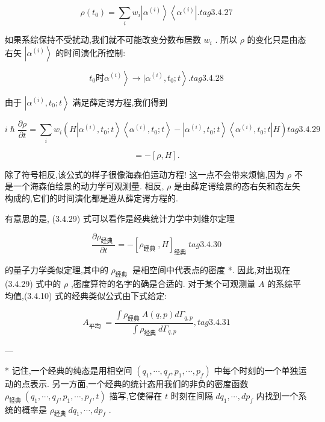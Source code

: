 $$
\rho \left( {t}_{0}\right) = \mathop{\sum }\limits_{i}{w}_{i}\left| {\alpha }^{\left( i\right) }\right\rangle \left\langle {\alpha }^{\left( i\right) }\right| . tag{3. 4.27}
$$

如果系综保持不受扰动,我们就不可能改变分数布居数 ${w}_{i}$ . 所以 $\rho$ 的变化只是由态右矢 $\left| {\alpha }^{\left( i\right) }\right\rangle$ 的时间演化所控制:

$$
{t}_{0}\text{时}\left. {\left. {\alpha }^{\left( i\right) }\right\rangle \rightarrow \mid {\alpha }^{\left( i\right) },{t}_{0};t}\right\rangle \text{.} tag{3. 4.28}
$$

由于 $\left| {{\alpha }^{\left( i\right) },{t}_{0};t}\right\rangle$ 满足薛定谔方程,我们得到

$$
i\hslash \frac{\partial \rho }{\partial t} = \mathop{\sum }\limits_{i}{w}_{i}\left( {H\left| {{\alpha }^{\left( i\right) },{t}_{0};t}\right\rangle \left\langle {{\alpha }^{\left( i\right) },{t}_{0};t}\right\rangle - \left| {{\alpha }^{\left( i\right) },{t}_{0};t}\right\rangle \left\langle {{\alpha }^{\left( i\right) },{t}_{0};t}\right| H}\right) tag{3. 4.29}
$$

$$
= - \left\lbrack {\rho, H}\right\rbrack \text{.}
$$

除了符号相反,该公式的样子很像海森伯运动方程! 这一点不会带来烦恼,因为 $\rho$ 不是一个海森伯绘景的动力学可观测量. 相反, $\rho$ 是由薛定谔绘景的态右矢和态左矢构成的,它们的时间演化都是遵从薛定谔方程的.

有意思的是, (3.4.29) 式可以看作是经典统计力学中刘维尔定理

$$
\frac{\partial {\rho }_{\text{经典 }}}{\partial t} = - {\left\lbrack {\rho }_{\text{经典 }}, H\right\rbrack }_{\text{经典 }} tag{3.4.30}
$$

的量子力学类似定理,其中的 ${\rho }_{\text{经典 }}$ 是相空间中代表点的密度 *. 因此,对出现在 (3.4.29) 式中的 $\rho$ ,密度算符的名字的确是合适的. 对于某个可观测量 $A$ 的系综平均值,(3.4.10) 式的经典类似公式由下式给定:

$$
{A}_{\text{平均 }} = \frac{\int {\rho }_{\text{经典 }}A\left( {q, p}\right) d{\Gamma }_{q, p}}{\int {\rho }_{\text{经典 }}d{\Gamma }_{q, p}}, tag{3. 4.31}
$$

---

* 记住,一个经典的纯态是用相空间 $\left( {{q}_{1},\cdots ,{q}_{f},{p}_{1},\cdots ,{p}_{f}}\right)$ 中每个时刻的一个单独运动的点表示. 另一方面,一个经典的统计态用我们的非负的密度函数 ${\rho }_{\text{轻典 }}\left( {{q}_{1},\cdots ,{q}_{f},{p}_{1},\cdots ,{p}_{f}, t}\right)$ 描写,它使得在 $t$ 时刻在间隔 $d{q}_{1},\cdots, d{p}_{f}$ 内找到一个系统的概率是 ${\rho }_{\text{经典 }}d{q}_{1},\cdots, d{p}_{f}$ .

